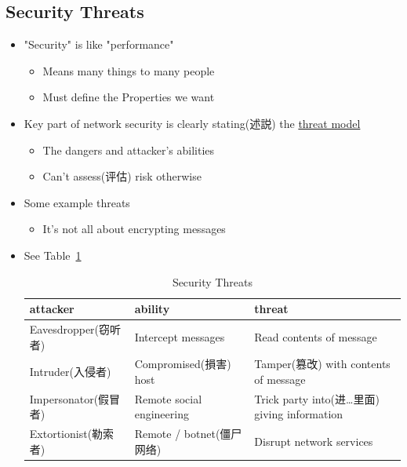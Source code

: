 \documentclass[12pt]{ctexart}   %
\begin{document}
	\subsection{Security Threats}
	\begin{itemize}
		\item "Security" is like "performance"
		\begin{itemize}
			\item Means many things to many people
			\item Must define the Properties we want
		\end{itemize}

		\item Key part of network security is clearly stating(述説) the \underline{threat model}
		\begin{itemize}
			\item The dangers and attacker's abilities
			\item Can't assess(评估) risk otherwise
		\end{itemize}

		\item Some example threats
		\begin{itemize}
			\item It's not all about encrypting messages
		\end{itemize}
		
		\item See Table~\ref{table:10-1-1}
		\begin{table}[h]
		\begin{center}
		\begin{tabular}{p{3cm}|p{4cm}|p{4cm}}   %
		\hline
		\hline
		\textbf{attacker}  & \textbf{ability} & \textbf{threat} \\ 
		\hline 
		Eavesdropper(窃听者) & Intercept messages & Read contents of message \\
		\hline
		Intruder(入侵者) & Compromised(損害) host & Tamper(篡改) with contents of message \\
		\hline
		Impersonator(假冒者) & Remote social engineering & Trick party into(进…里面) giving information \\
		\hline
		Extortionist(勒索者) & Remote / botnet(僵尸网络) & Disrupt network services \\
		\hline
		\hline
		\end{tabular}
		\end{center}
		\caption{Security Threats} 
		\label{table:10-1-1}
		\end{table}
	\end{itemize}
\end{document}

